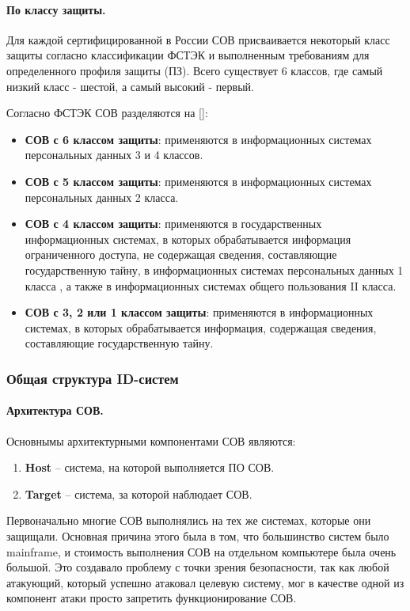 \paragraph*{По классу защиты.}

Для каждой сертифицированной в России СОВ присваивается некоторый класс защиты 
согласно классификации ФСТЭК и выполненным требованиям для определенного профиля защиты (ПЗ).
Всего существует 6 классов, где самый низкий класс - шестой, а самый высокий - первый.

Согласно ФСТЭК СОВ разделяются на [\cite{IDSFSTEK}]:
\begin{itemize}
	\item \textbf{СОВ с 6 классом защиты}: применяются в информационных системах персональных данных 3 и 4 классов.
	\item \textbf{СОВ с 5 классом защиты}: применяются в информационных системах персональных данных 2 класса.
	\item \textbf{СОВ с 4 классом защиты}: применяются в государственных информационных системах, 
	в которых обрабатывается информация ограниченного доступа, не содержащая сведения, 
	составляющие государственную тайну, в информационных системах персональных данных 1 класса , 
	а также в информационных системах общего пользования II класса.
	\item \textbf{СОВ с 3, 2 или 1 классом защиты}: применяются в информационных системах, 
	в которых обрабатывается информация, содержащая сведения, составляющие государственную тайну.
\end{itemize}


\subsubsection{Общая структура ID-систем} 

\paragraph*{Архитектура СОВ.} Основнымы архитектурными компонентами СОВ являются: 
\begin{enumerate}
	\item \textbf{Host} -- система, на которой выполняется ПО СОВ.
	\item \textbf{Target} -- система, за которой наблюдает СОВ.
\end{enumerate}

Первоначально многие СОВ выполнялись на тех же системах, которые они защищали. 
Основная причина этого была в том, что большинство систем было mainframe, и стоимость выполнения СОВ 
на отдельном компьютере была очень большой. Это создавало проблему с точки зрения безопасности, так как 
любой атакующий, который успешно атаковал целевую систему, мог в качестве одной из компонент атаки просто 
запретить функционирование СОВ.

